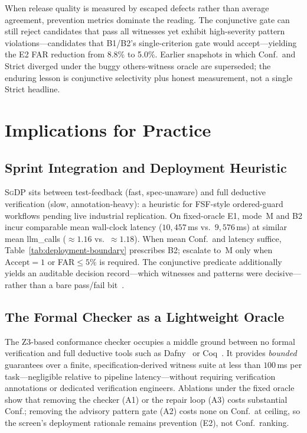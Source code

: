 When release quality is measured by escaped defects rather than average
agreement, prevention metrics dominate the reading.
The conjunctive gate can still reject candidates that pass all witnesses yet
exhibit high-severity pattern violations---candidates that B1/B2's
single-criterion gate would accept---yielding the E2 FAR reduction from
8.8\% to 5.0\%.
Earlier snapshots in which Conf.\ and Strict diverged under the buggy
others-witness oracle are superseded; the enduring lesson is conjunctive
selectivity plus honest measurement, not a single Strict headline.


\section{Implications for Practice}
\label{sec:disc:implications}

\subsection{Sprint Integration and Deployment Heuristic}

\textsc{SgDP} sits between test-feedback (fast, spec-unaware) and full
deductive verification (slow, annotation-heavy): a heuristic for FSF-style
ordered-guard workflows pending live industrial replication.
On fixed-oracle E1, mode~M and B2 incur comparable mean wall-clock latency
($10{,}457$\,ms vs.\ $9{,}576$\,ms) at similar mean llm\_calls
(${\approx}1.16$ vs.\ ${\approx}1.18$).
When mean Conf.\ and latency suffice, Table~\ref{tab:deployment-boundary}
prescribes B2; escalate to~M only when $\mathrm{Accept}{=}1$ or
FAR${\le}5\%$ is required.
The conjunctive predicate additionally yields an auditable decision
record---which witnesses and patterns were decisive---rather than a bare
pass/fail bit~\citep{harman2004maff,beck2004xp}.

\subsection{The Formal Checker as a Lightweight Oracle}

The Z3-based conformance checker occupies a middle ground between no formal
verification and full deductive tools such as Dafny~\citep{leino2010dafny}
or Coq~\citep{woodcock2009formalsurvey}.
It provides \emph{bounded} guarantees over a finite, specification-derived
witness suite at less than $100$\,ms per task---negligible relative to
pipeline latency---without requiring verification annotations or dedicated
verification engineers.
Ablations under the fixed oracle show that removing the checker (A1) or the
repair loop (A3) costs substantial Conf.; removing the advisory pattern gate
(A2) costs none on Conf.\ at ceiling, so the screen's deployment rationale
remains prevention (E2), not Conf.\ ranking.

